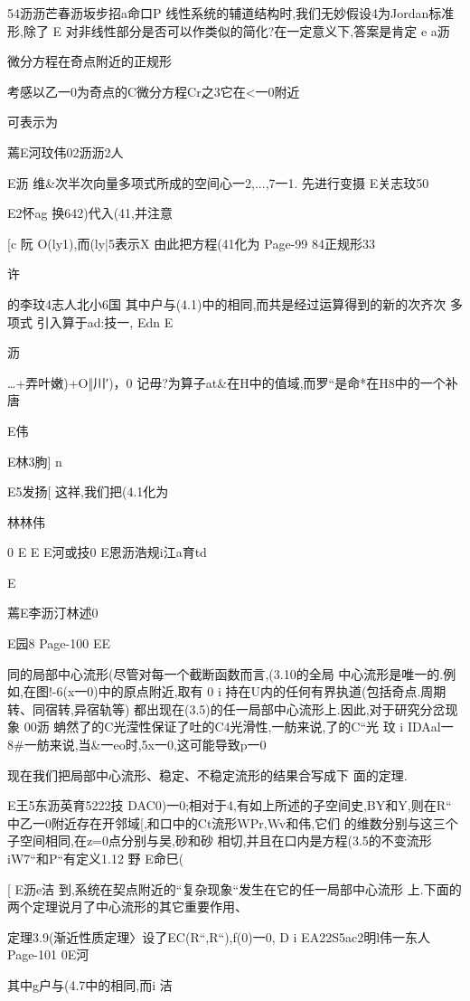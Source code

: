 {{{54沥沥芒春沥坂步招a命口P
线性系统的辅道结构时,我们无妙假设4为Jordan标准形,除了
E
对非线性部分是否可以作类似的简化?在一定意义下,答案是肯定
e
a沥

微分方程在奇点附近的正规形

考感以乙一0为奇点的C微分方程Cr之3它在<一0附近

可表示为

蔫E河玟伟02沥沥2人

E沥
维&次半次向量多项式所成的空间心一2,...,7一1.
先进行变摄
E关志玟50

E2怀ag
换642)代入(41,并注意

[c
阮
O(ly1),而(ly|5表示X%
由此把方程(41化为
Page-99
84正规形33

许

的李玟4志人北小6国
其中户与(4.1)中的相同,而共是经过运算得到的新的次齐次
多项式
引入算于ad:技一,
Edn
E

沥

…+弄叶嫩)+O‖川′)，0
记毋?为算子at&在H中的值域,而罗“是命*在H8中的一个补
唐

E伟

E林3朐]
n

E5发扬[
这祥,我们把(4.1化为

林林伟

0
E
E
E河或技0
E恩沥浩规i江a育td

E

蔫E李沥汀林述0

E园8
Page-100
EE

同的局部中心流形(尽管对每一个截断函数而言,(3.10的全局
中心流形是唯一的.例如,在图!-6(x一0)中的原点附近,取有
0
i
持在U内的任何有界执道(包括奇点.周期转、同宿转,异宿轨等)
都出现在(3.5)的任一局部中心流形上.因此,对于研究分岔现象
00沥
蚺然了的C光滢性保证了吐的C4光滑性,一舫来说,了的C“光
玟
i
IDAal一8#一舫来说,当&一eo时,5x一0,这可能导致p一0

现在我们把局部中心流形、稳定、不稳定流形的结果合写成下
面的定理.

E王5东沥英育5222技
DAC0)一0;相对于4,有如上所述的子空间史,BY和Y,则在R“
中乙一0附近存在开邻域[,和口中的Ct流形WPr,Wv和伟,它们
的维数分别与这三个子空间相同,在z=0点分别与吴,砂和砂
相切,并且在口内是方程(3.5的不变流形iW7“和P“有定义1.12
野
E命巳(

[
E沥e洁
到,系统在契点附近的“复杂现象“发生在它的任一局部中心流形
上.下面的两个定理说月了中心流形的其它重要作用、

定理3.9(渐近性质定理〉设了EC(R“,R“),f(0)一0,
D
i
EA22S5ac2明l伟一东人
Page-101
0E河

其中g户与(4.7中的相同,而i
洁

}}}
